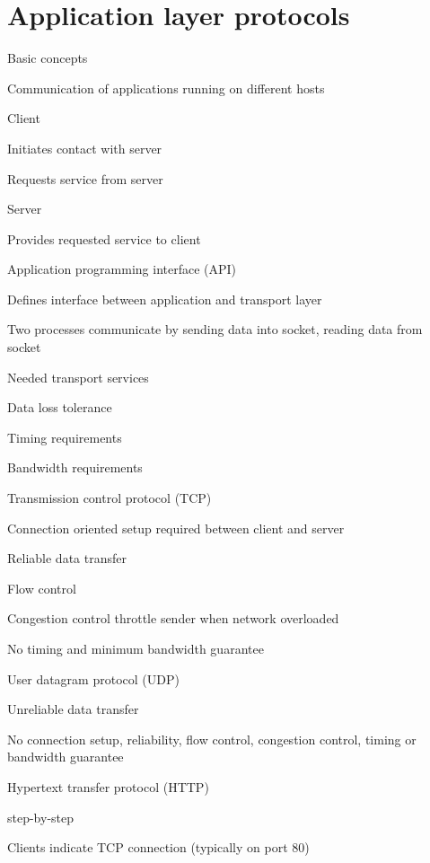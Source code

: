 \section{Application layer protocols}
\enumstart
	\item Basic concepts
	\enumstart
		\item Communication of applications running on different hosts
		\item Client
		\enumstart
			\item Initiates contact with server
			\item Requests service from server
		\enumend
		\item Server
		\enumstart
			\item Provides requested service to client
		\enumend
		\item Application programming interface (API)
		\enumstart
			\item Defines interface between application and transport layer
			\item Two processes communicate by sending data into socket, reading data from socket
		\enumend
		\item Needed transport services
		\enumstart
			\item Data loss tolerance
			\item Timing requirements
			\item Bandwidth requirements
		\enumend
	\enumend
	\item Transmission control protocol (TCP)
	\enumstart
		\item Connection oriented \arrow setup required between client and server
		\item Reliable data transfer
		\item Flow control
		\item Congestion control \arrow throttle sender when network overloaded
		 \item No timing and minimum bandwidth guarantee
	\enumend
	\item User datagram protocol (UDP)
	\enumstart
		\item Unreliable data transfer
		\item No connection setup, reliability, flow control, congestion control, timing or bandwidth guarantee
	\enumend
	\item Hypertext transfer protocol (HTTP)
	\enumstart
		\item step-by-step
		\enumstart
			\item Clients indicate TCP connection (typically on port 80)
